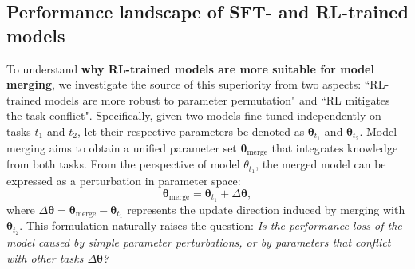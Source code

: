 \documentclass{article} %
\begin{document}

\subsection{Performance landscape of SFT- and RL-trained models}

To understand \textbf{why RL-trained models are more suitable for model merging}, we investigate the source of this superiority from two aspects: ``RL-trained models are more robust to parameter permutation" and ``RL mitigates the task conflict". Specifically, given two models fine-tuned independently on tasks $t_1$ and $t_2$, let their respective parameters be denoted as $\bm{\theta}_{t_1}$ and $\bm{\theta}_{t_2}$. Model merging aims to obtain a unified parameter set $\bm{\theta}_{\text{merge}}$ that integrates knowledge from both tasks. From the perspective of model $\theta_{t_1}$, the merged model can be expressed as a perturbation in parameter space:
\begin{equation}
    \bm{\theta}_{\text{merge}} = \bm{\theta}_{t_1} + \Delta\bm{\theta},
\end{equation}
where $\Delta\bm{\theta} = \bm{\theta}_{\text{merge}} - \bm{\theta}_{t_1}$ represents the update direction induced by merging with $\bm{\theta}_{t_2}$. This formulation naturally raises the question: \textit{Is the performance loss of the model caused by simple parameter perturbations, or by parameters that conflict with other tasks $\Delta\bm{\theta}$?} 
\end{document}
